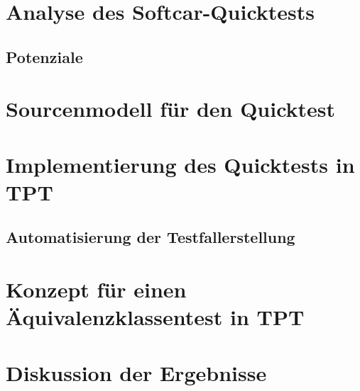 	
		\chapter{Analyse des Softcar-Quicktests}
			
		\newpage
		\section*{Potenziale}
			
		\chapter{Sourcenmodell für den Quicktest}
			
		


	\chapter{Implementierung des Quicktests in TPT}
		
		\section*{Automatisierung der Testfallerstellung}
				
	\chapter{Konzept für einen Äquivalenzklassentest in TPT}
		
					
					
	\chapter{Diskussion der Ergebnisse}
		
		

